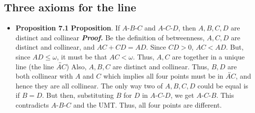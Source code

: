 \documentclass{report}
\begin{document}
    \subsection{Three axioms for the line}
    \begin{itemize}
        \item \textbf{Proposition 7.1}
            \bigbreak \noindent 
            \textbf{Proposition}. If $A\text{-}B\text{-}C$ and $A\text{-}C\text{-}D$, then $A,B,C,D$ are distinct and collinear 
            \bigbreak \noindent 
            \textbf{\textit{Proof.}} Be the definition of betweenness, $A,C,D$ are distinct and collinear, and $AC + CD = AD$. Since $CD > 0$, $AC < AD$. But, since $AD \leq \omega$, it must be that $AC < \omega$. Thus, $A,C$ are together in a unique line  (the line $\overleftrightarrow{AC} $)
            \bigbreak \noindent 
            Also, $A,B,C$ are distinct and collinear. Thus, $B,D$ are both collinear with $A$ and $C$ which implies all four points must be in $\overleftrightarrow{AC}$, and hence they are all collinear.
            \bigbreak \noindent 
            The only way two of $A,B,C,D$ could be equal is if $B =D$. But then, substituting $B$ for $D$ in $A\text{-}C\text{-}D$, we get $A\text{-}C\text{-}B$. This contradicts $A\text{-}B\text{-}C$ and the UMT. Thus, all four points are different. \endpf


\end{itemize}
\end{document}
